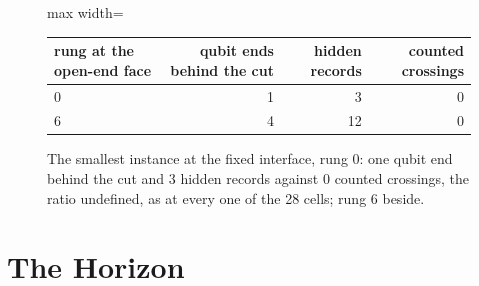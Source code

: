 \begin{figure}[h]
\centering
\begin{adjustbox}{max width=\linewidth}\begin{tabular}{lrrr}
\hline
rung at the open-end face & qubit ends behind the cut & hidden records & counted crossings \\
\hline
0 & 1 & 3 & 0 \\
6 & 4 & 12 & 0 \\
\hline
\end{tabular}\end{adjustbox}
\caption{The smallest instance at the fixed interface, rung 0: one qubit end behind the cut and 3 hidden records against 0 counted crossings, the ratio undefined, as at every one of the 28 cells; rung 6 beside.}
\end{figure}
\section*{The Horizon}
